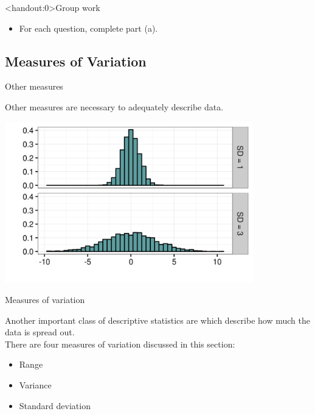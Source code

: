 \documentclass[xcolor=table]{beamer}
\begin{document}
\begin{frame}<handout:0>{Group work}
\begin{block}{}
\large
\begin{itemize}
\item For each question, complete part (a).
\end{itemize}
\end{block}
\end{frame}



\subsection{Measures of Variation}

\begin{frame}{Other measures}
\begin{block}{}
\large
Other measures are necessary to adequately describe data.
\end{block}
\pause
\bigskip
{\centering
\includegraphics[width=4.25in]{../images/ch03_var_diff}
\par}
\end{frame}

\begin{frame}{Measures of variation}
\begin{block}{}
\large
Another important class of descriptive statistics are  which describe how much the data is spread out.\\
\medskip
There are four measures of variation discussed in this section:
\begin{itemize}
\item Range
\item Variance
\item Standard deviation
\end{itemize}

\end{block}
\end{frame}
\end{document}
